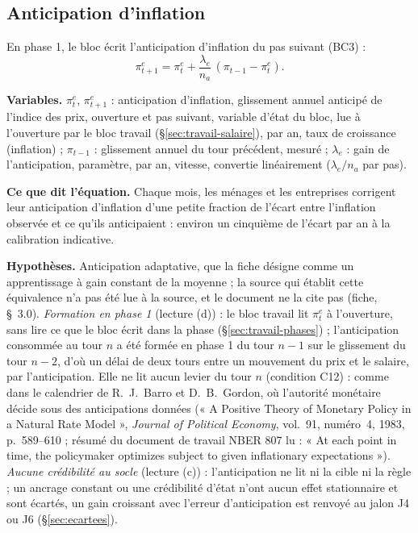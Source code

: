 \documentclass[11pt,a4paper]{article}
\newcommand{\variables}{\par\noindent\textbf{Variables.} }
\newcommand{\sens}{\par\noindent\textbf{Ce que dit l'équation.} }
\newcommand{\hyp}{\par\noindent\textbf{Hypothèses.} }
\begin{document}
\subsection{Anticipation d'inflation}
\label{sec:banque_centrale-anticipation}
\begin{proposee}
En phase 1, le bloc écrit l'anticipation d'inflation du pas suivant (BC3) :
\begin{equation}
\pi^e_{t+1} = \pi^e_t + \frac{\lambda_e}{n_a}\,(\pi_{t-1} - \pi^e_t) . \tag{BC3}\label{eq:banque_centrale-anticipation}
\end{equation}
\begin{lecture}
\variables $\pi^e_t$, $\pi^e_{t+1}$ : anticipation d'inflation, glissement annuel anticipé de l'indice des prix, ouverture et pas suivant, variable d'état du bloc, lue à l'ouverture par le bloc travail (\S\ref{sec:travail-salaire}), par an, taux de croissance (inflation) ; $\pi_{t-1}$ : glissement annuel du tour précédent, mesuré ; $\lambda_e$ : gain de l'anticipation, paramètre, par an, vitesse, convertie linéairement ($\lambda_e/n_a$ par pas).
\sens Chaque mois, les ménages et les entreprises corrigent leur anticipation d'inflation d'une petite fraction de l'écart entre l'inflation observée et ce qu'ils anticipaient : environ un cinquième de l'écart par an à la calibration indicative.
\hyp Anticipation adaptative, que la fiche désigne comme un apprentissage à gain constant de la moyenne ; la source qui établit cette équivalence n'a pas été lue à la source, et le document ne la cite pas (fiche, \S~3.0). \emph{Formation en phase 1} (lecture (d)) : le bloc travail lit $\pi^e_t$ à l'ouverture, sans lire ce que le bloc écrit dans la phase (\S\ref{sec:travail-phases}) ; l'anticipation consommée au tour $n$ a été formée en phase 1 du tour $n - 1$ sur le glissement du tour $n - 2$, d'où un délai de deux tours entre un mouvement du prix et le salaire, par l'anticipation. Elle ne lit aucun levier du tour $n$ (condition C12) : comme dans le calendrier de R.~J.~Barro et D.~B.~Gordon, où l'autorité monétaire décide sous des anticipations données (« A Positive Theory of Monetary Policy in a Natural Rate Model », \emph{Journal of Political Economy}, vol.~91, numéro~4, 1983, p.~589--610 ; résumé du document de travail NBER 807 lu : « At each point in time, the policymaker optimizes subject to given inflationary expectations »). \emph{Aucune crédibilité au socle} (lecture (c)) : l'anticipation ne lit ni la cible ni la règle ; un ancrage constant ou une crédibilité d'état n'ont aucun effet stationnaire et sont écartés, un gain croissant avec l'erreur d'anticipation est renvoyé au jalon J4 ou J6 (\S\ref{sec:ecartees}).

\end{lecture}
\end{proposee}
\end{document}
